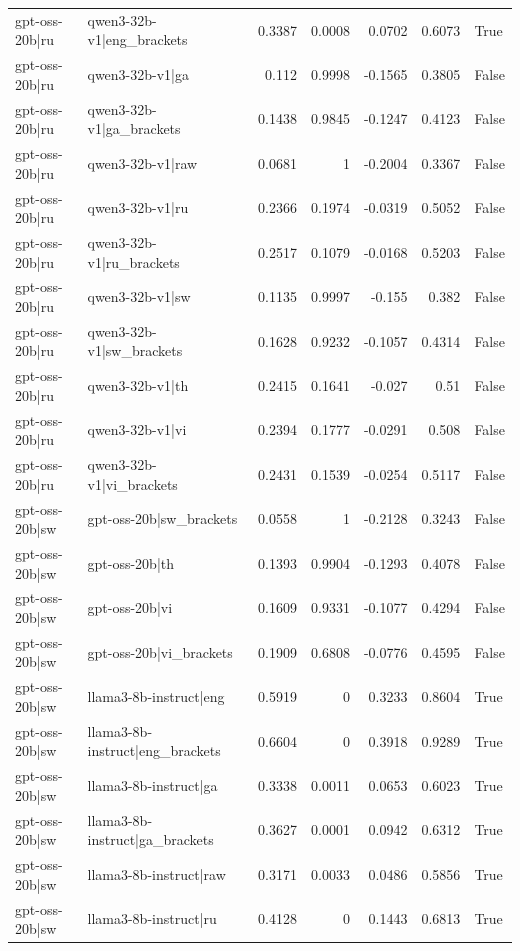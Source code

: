 \begin{table}
\begin{tabular}{l l r r r r l}
gpt-oss-20b|ru & qwen3-32b-v1|eng_brackets & 0.3387 & 0.0008 & 0.0702 & 0.6073 & True \\
gpt-oss-20b|ru & qwen3-32b-v1|ga & 0.112 & 0.9998 & -0.1565 & 0.3805 & False \\
gpt-oss-20b|ru & qwen3-32b-v1|ga_brackets & 0.1438 & 0.9845 & -0.1247 & 0.4123 & False \\
gpt-oss-20b|ru & qwen3-32b-v1|raw & 0.0681 & 1 & -0.2004 & 0.3367 & False \\
gpt-oss-20b|ru & qwen3-32b-v1|ru & 0.2366 & 0.1974 & -0.0319 & 0.5052 & False \\
gpt-oss-20b|ru & qwen3-32b-v1|ru_brackets & 0.2517 & 0.1079 & -0.0168 & 0.5203 & False \\
gpt-oss-20b|ru & qwen3-32b-v1|sw & 0.1135 & 0.9997 & -0.155 & 0.382 & False \\
gpt-oss-20b|ru & qwen3-32b-v1|sw_brackets & 0.1628 & 0.9232 & -0.1057 & 0.4314 & False \\
gpt-oss-20b|ru & qwen3-32b-v1|th & 0.2415 & 0.1641 & -0.027 & 0.51 & False \\
gpt-oss-20b|ru & qwen3-32b-v1|vi & 0.2394 & 0.1777 & -0.0291 & 0.508 & False \\
gpt-oss-20b|ru & qwen3-32b-v1|vi_brackets & 0.2431 & 0.1539 & -0.0254 & 0.5117 & False \\
gpt-oss-20b|sw & gpt-oss-20b|sw_brackets & 0.0558 & 1 & -0.2128 & 0.3243 & False \\
gpt-oss-20b|sw & gpt-oss-20b|th & 0.1393 & 0.9904 & -0.1293 & 0.4078 & False \\
gpt-oss-20b|sw & gpt-oss-20b|vi & 0.1609 & 0.9331 & -0.1077 & 0.4294 & False \\
gpt-oss-20b|sw & gpt-oss-20b|vi_brackets & 0.1909 & 0.6808 & -0.0776 & 0.4595 & False \\
gpt-oss-20b|sw & llama3-8b-instruct|eng & 0.5919 & 0 & 0.3233 & 0.8604 & True \\
gpt-oss-20b|sw & llama3-8b-instruct|eng_brackets & 0.6604 & 0 & 0.3918 & 0.9289 & True \\
gpt-oss-20b|sw & llama3-8b-instruct|ga & 0.3338 & 0.0011 & 0.0653 & 0.6023 & True \\
gpt-oss-20b|sw & llama3-8b-instruct|ga_brackets & 0.3627 & 0.0001 & 0.0942 & 0.6312 & True \\
gpt-oss-20b|sw & llama3-8b-instruct|raw & 0.3171 & 0.0033 & 0.0486 & 0.5856 & True \\
gpt-oss-20b|sw & llama3-8b-instruct|ru & 0.4128 & 0 & 0.1443 & 0.6813 & True \\

\end{tabular}
\end{table}
